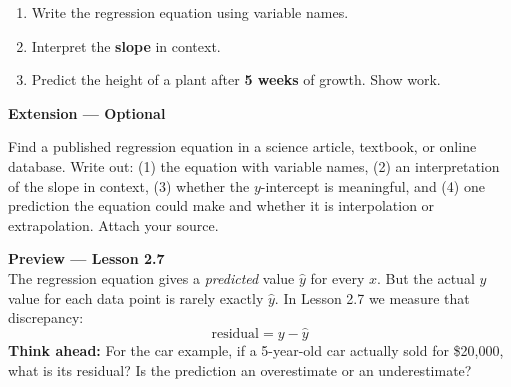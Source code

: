 \documentclass[10pt]{article}
\begin{document}
\vspace{10pt}

\begin{enumerate}[label=\textbf{(\alph*)}, leftmargin=2em, itemsep=0.18in]

  \item Write the regression equation using variable names.\\[8pt]

  \item Interpret the \textbf{slope} in context.\\[8pt]

  \item Predict the height of a plant after \textbf{5 weeks} of growth.
        Show work.\\[8pt]

\end{enumerate}

\vspace{0.18in}

\begin{extensionbox}
\small\textbf{Extension --- Optional}

Find a published regression equation in a science article, textbook, or online database.
Write out: (1) the equation with variable names, (2) an interpretation of the slope in
context, (3) whether the $y$-intercept is meaningful, and (4) one prediction the equation
could make and whether it is interpolation or extrapolation. Attach your source.
\end{extensionbox}

\vspace{0.16in}

\begin{tcolorbox}[colback=greenbg, colframe=greenacc, boxrule=0.8pt, arc=2mm,
    left=4mm, right=4mm, top=3mm, bottom=3mm]
\small\textbf{Preview --- Lesson 2.7}\\[4pt]
The regression equation gives a \emph{predicted} value $\hat{y}$ for every $x$. But the
actual $y$ value for each data point is rarely exactly $\hat{y}$. In Lesson 2.7 we measure
that discrepancy:
\[
  \text{residual} = y - \hat{y}
\]
\textbf{Think ahead:} For the car example, if a 5-year-old car actually sold for \$20{,}000,
what is its residual? Is the prediction an overestimate or an underestimate?\\[6pt]
\end{tcolorbox}
\end{document}
